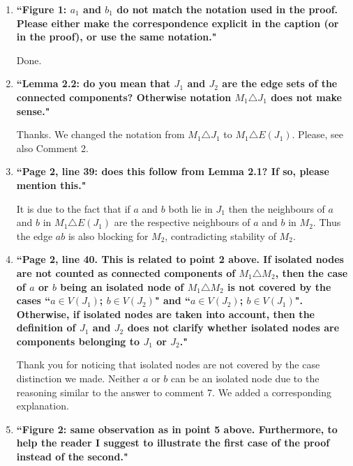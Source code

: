 \documentclass[11pt]{article}
\begin{document}
\begin{enumerate}
	\item \textbf{``Figure 1: $a_1$ and $b_1$ do not match the notation used in the proof. Please either make
the correspondence explicit in the caption (or in the proof), or use the same notation."}
	
	\smallskip
	
	Done.
	
	\bigskip
	
	\item \textbf{``Lemma 2.2: do you mean that $J_1$ and $J_2$ are the edge sets of the connected components? Otherwise notation $M_1\triangle J_1$ does not make sense."}
	
	\smallskip
	
	Thanks. We changed the notation from $M_1\triangle J_1$ to $M_1\triangle E(J_1)$. Please, see also Comment 2.
	
	\bigskip
	
	\item \textbf{``Page 2, line 39: does this follow from Lemma 2.1? If so, please mention this."}
	
	\smallskip
	
	It is due to the fact that if $a$ and $b$ both lie in $J_1$ then the neighbours of $a$ and $b$ in $M_1\triangle E(J_1)$ are the respective neighbours of $a$ and $b$ in $M_2$. Thus the edge $ab$ is also blocking for $M_2$, contradicting stability of $M_2$.
	
	\bigskip
	
		
	\item \textbf{``Page 2, line 40. This is related to point 2 above. If isolated nodes are not counted as
connected components of $M_1\triangle M_2$, then the case of $a$ or $b$ being an isolated node of
$M_1\triangle M_2$ is not covered by the cases ``$a \in V (J_1)$; $b \in V (J_2)$" and ``$a \in V (J_2)$; $b \in V (J_1)$". Otherwise, if isolated nodes are taken into account, then the definition of $J_1$ and $J_2$ does
not clarify whether isolated nodes are components belonging to $J_1$ or $J_2$."}
	
	\smallskip
	
	Thank you for noticing that isolated nodes are not covered by the case distinction we made. Neither $a$ or $b$ can be an isolated node due to the reasoning similar to the answer to comment 7. We added a corresponding explanation.
	
	\bigskip

	\item \textbf{``Figure 2: same observation as in point 5 above. Furthermore, to help the reader I
suggest to illustrate the first case of the proof instead of the second."}
	

\end{enumerate}
\end{document}
